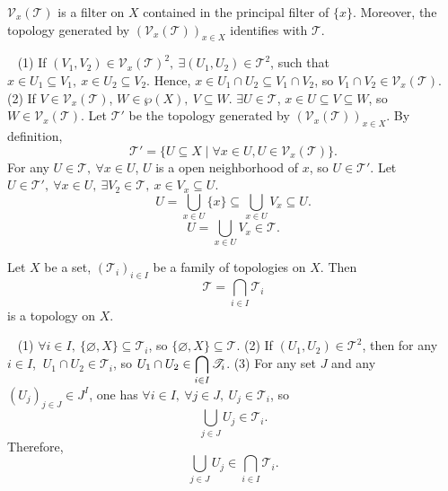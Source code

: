\begin{propositionenv}
    $\mathcal{V}_x(\mathscr{T})$ is a filter on $X$ contained in the principal filter of $\{x\}$. Moreover, the topology generated by $\left(\mathcal{V}_x(\mathscr{T})\right)_{x\in X}$ identifies with $\mathscr{T}$.
\end{propositionenv}
\begin{proofenv}
    \ \newline
    (1) If $(V_1,V_2)\in \mathcal{V}_x(\mathscr{T})^2,\ \exists (U_1,U_2)\in \mathscr{T}^2$, such that $x\in U_1\subseteq V_1,\ x\in U_2\subseteq V_2$. Hence, $x\in U_1\cap U_2\subseteq V_1\cap V_2$, so $V_1\cap V_2\in \mathcal{V}_{x}(\mathscr{T})$.
    \newline
    (2) If $V\in \mathcal{V}_x(\mathscr{T})$, $W\in \wp(X),\ V\subseteq W$. $\exists U\in \mathscr{T}$, $x\in U\subseteq V\subseteq W$, so $W\in \mathcal{V}_x(\mathscr{T})$. Let $\mathscr{T}'$ be the topology generated by $\left(\mathcal{V}_x(\mathscr{T})\right)_{x\in X}$. By definition,
    $$\mathscr{T}'=\{U\subseteq X\mid \forall x\in U, U\in \mathcal{V}_x(\mathscr{T})\}.$$
    For any $U\in \mathscr{T},\ \forall x\in U  $, $U$ is a open neighborhood of $x$, so $U\in \mathscr{T}'$. Let $U\in \mathscr{T}', \ \forall x\in U,\ \exists V_2\in \mathscr{T},\ x\in V_x\subseteq U$.
    $$U=\bigcup_{x\in U}\{x\}\subseteq \bigcup_{x\in U}V_x\subseteq U.$$
    $$U=\bigcup_{x\in U}V_x\in \mathscr{T}.$$
\end{proofenv}
\begin{propositionenv}
    Let $X$ be a set, $\left(\mathscr{T}_i\right)_{i\in I}$ be a family of topologies on $X$. Then 
    $$\mathscr{T}=\bigcap_{i\in I}\mathscr{T}_i$$
    is a topology on $X$.
\end{propositionenv}
\begin{proofenv}
    \ \newline
    (1) $\forall i\in I,\ \{\varnothing,X\}\subseteq \mathscr{T}_i$, so $\{\varnothing,X\}\subseteq \mathscr{T}$.
    \newline
    (2) If $(U_1,U_2)\in \mathscr{T}^2$, then for any $i\in I$, $\ U_1\cap U_2\in \mathscr{T}_i$, so $\displaystyle U_1\cap U_2\in \bigcap_{i\in I}\mathscr{T}_i$.
    \newline
    (3) For any set $J$ and any $\left(U_j\right)_{j\in J}\in J^I$, one has $\forall i\in I,\ \forall j\in J,\ U_j\in \mathscr{T}_i$, so
    $$\bigcup_{j\in J}U_j\in \mathscr{T}_i.$$
    Therefore, $$\bigcup_{j\in J}U_j\in \bigcap_{i\in I}\mathscr{T}_i.$$ 
\end{proofenv}
